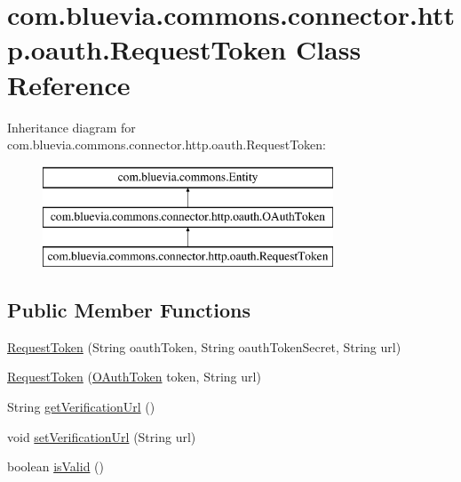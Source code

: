 \hypertarget{classcom_1_1bluevia_1_1commons_1_1connector_1_1http_1_1oauth_1_1RequestToken}{
\section{com.bluevia.commons.connector.http.oauth.RequestToken Class Reference}
\label{classcom_1_1bluevia_1_1commons_1_1connector_1_1http_1_1oauth_1_1RequestToken}
}
Inheritance diagram for com.bluevia.commons.connector.http.oauth.RequestToken:\begin{figure}[H]
\begin{center}
\leavevmode
\includegraphics[height=3.000000cm]{classcom_1_1bluevia_1_1commons_1_1connector_1_1http_1_1oauth_1_1RequestToken}
\end{center}
\end{figure}
\subsection*{Public Member Functions}
\begin{DoxyCompactItemize}
\item 
\hyperlink{classcom_1_1bluevia_1_1commons_1_1connector_1_1http_1_1oauth_1_1RequestToken_adfb03f1f66e80708f04277a348af6f2a}{RequestToken} (String oauthToken, String oauthTokenSecret, String url)
\item 
\hyperlink{classcom_1_1bluevia_1_1commons_1_1connector_1_1http_1_1oauth_1_1RequestToken_a5a39f858c126b254a02d8387e56cb3d5}{RequestToken} (\hyperlink{classcom_1_1bluevia_1_1commons_1_1connector_1_1http_1_1oauth_1_1OAuthToken}{OAuthToken} token, String url)
\item 
String \hyperlink{classcom_1_1bluevia_1_1commons_1_1connector_1_1http_1_1oauth_1_1RequestToken_ac6dcd82d646e3a8b1aabd13be0810d5f}{getVerificationUrl} ()
\item 
void \hyperlink{classcom_1_1bluevia_1_1commons_1_1connector_1_1http_1_1oauth_1_1RequestToken_a7a644ea4e121d1a6d672b4556aa1c3d3}{setVerificationUrl} (String url)
\item 
boolean \hyperlink{classcom_1_1bluevia_1_1commons_1_1connector_1_1http_1_1oauth_1_1RequestToken_aedb20b853eaaf5224658f2ecdf412cdc}{isValid} ()
\end{DoxyCompactItemize}



